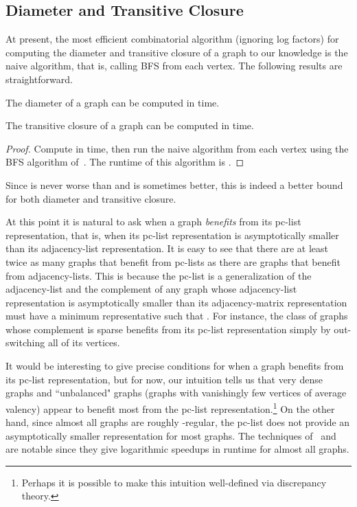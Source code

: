 \documentclass{llncs}
\begin{document}
\subsection{Diameter and Transitive Closure}

At present, the most efficient combinatorial algorithm (ignoring log factors) for computing the diameter and transitive closure of a graph to our knowledge is the naive  algorithm, that is, calling BFS from each vertex.  The following results are straightforward.
\begin{theorem}
The diameter of a graph  can be computed in  time.
\end{theorem}
\begin{theorem}
The transitive closure of a graph  can be computed in  time.
\end{theorem}
\begin{proof}
Compute  in  time,  then run the naive algorithm from each vertex using the BFS algorithm of~\cite{DahlhausGM02}.  The runtime of this algorithm is .
\end{proof}
\noindent Since  is never worse than  and is sometimes better, this is indeed a better bound for both diameter and transitive closure.  

At this point it is natural to ask when a graph \emph{benefits} from its pc-list representation, that is, when its pc-list representation is asymptotically smaller than its adjacency-list representation.  It is easy to see that there are at least twice as many graphs that benefit from pc-lists as there are graphs that benefit from adjacency-lists.  This is because the pc-list is a generalization of the adjacency-list and the complement of any graph whose adjacency-list representation is asymptotically smaller than its adjacency-matrix representation must have a minimum representative  such that .  For instance, the class of graphs whose complement is sparse benefits from its pc-list representation simply by out-switching all of its vertices. 

It would be interesting to give precise conditions for when a graph benefits from its pc-list representation, but for now, our intuition tells us that very dense graphs and ``unbalanced" graphs (graphs with vanishingly few vertices of average valency) appear to benefit most from the pc-list representation.\footnote{Perhaps it is possible to make this intuition well-defined via discrepancy theory.}  On the other hand, since almost all graphs are roughly -regular, the pc-list does not provide an asymptotically smaller representation for most graphs.  The techniques of~\cite{CheriyanM96} and~\cite{FederM95} are notable since they give logarithmic speedups in runtime for almost all graphs.
\end{document}
